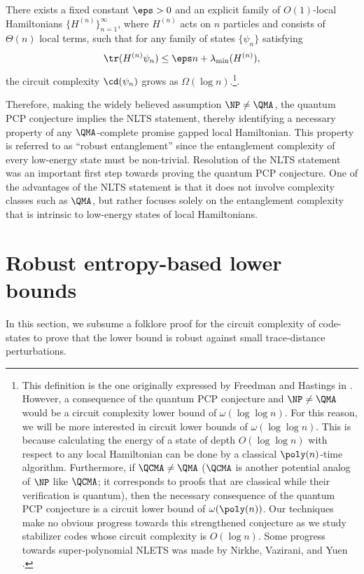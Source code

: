 \documentclass{toc}
\begin{document}
\begin{theorem}
There exists a fixed constant $\eps > 0$ and an explicit family of $O(1)$-local Hamiltonians $\{H^{(n)}\}_{n=1}^\infty$, where $H^{(n)}$ acts on $n$ particles and consists of $\Theta(n)$ local terms, such that for any family of states $\{\psi_n\}$ satisfying %
\begin{align}\tr(H^{(n)} \psi_n) \leq \eps n + \lambda_{\min}(H^{(n)}),
\end{align}
the circuit complexity $\cd(\psi_n)$ grows as $\Omega(\log n)$.\footnote{This definition is the one originally expressed by Freedman and Hastings in \cite{10.5555/2600498.2600507}. However, a consequence of the quantum PCP conjecture and $\NP \neq \QMA$ would be a circuit complexity lower bound of $\omega(\log \log n)$. For this reason, we will be more interested in circuit lower bounds of $\omega(\log \log n)$. This is because calculating the energy of a state of depth $O(\log \log n)$ with respect to any local Hamiltonian can be done by a classical $\poly(n)$-time algorithm. Furthermore, if $\QCMA \neq \QMA$ ($\QCMA$ is another potential analog of $\NP$ like $\QCMA$; it corresponds to proofs that are classical while their verification is quantum), then the necessary consequence of the quantum PCP conjecture is a circuit lower bound of $\omega(\poly(n))$. Our techniques make no obvious progress towards this strengthened conjecture as we study stabilizer codes whose circuit complexity is $O(\log n)$. Some progress towards super-polynomial NLETS was made by Nirkhe, Vazirani, and Yuen \cite{nirkhe_et_al:LIPIcs:2018:9095}.}.
\end{theorem}

Therefore, making the widely believed assumption $\NP \neq \QMA$, the quantum PCP conjecture implies the NLTS statement, thereby identifying a necessary property of any $\QMA$-complete promise gapped local Hamiltonian. This property is referred to as ``robust entanglement'' since the entanglement complexity of every low-energy state must be non-trivial. Resolution of the NLTS statement was an important first step towards proving the quantum PCP conjecture. One of the advantages of the NLTS statement is that it does not involve complexity classes such as $\QMA$, but rather focuses solely on the entanglement complexity that is intrinsic to low-energy states of local Hamiltonians.



\section{Robust entropy-based lower bounds}
\label{sec:warmup-entropy}
In this section, we subsume a folklore proof for the circuit complexity of code-states to prove that the lower bound is robust %
against  %
small trace-distance perturbations. %
%
\end{document}
